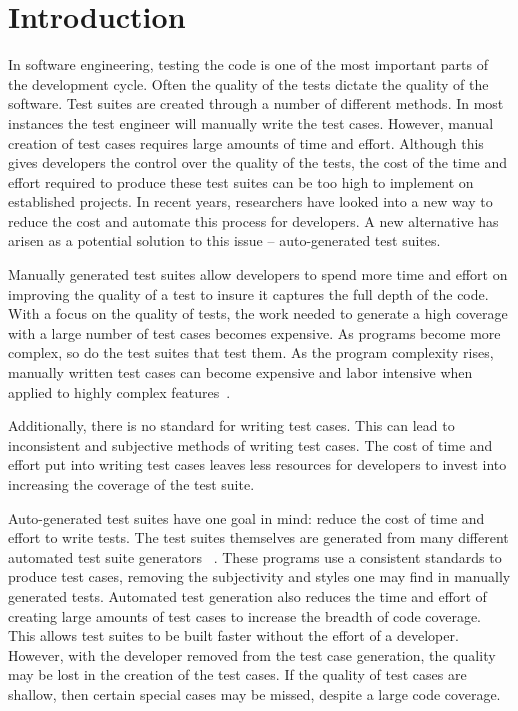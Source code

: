 \section{Introduction}
In software engineering, testing the code is one of the most important parts of the development cycle. Often the quality of the tests dictate the quality of the software. Test suites are created through a number of different methods. In most instances the test engineer will manually write the test cases. However, manual creation of test cases requires large amounts of time and effort. Although this gives developers the control over the quality of the tests, the cost of the time and effort required to produce these test suites can be too high to implement on established projects. In recent years, researchers have looked into a new way to reduce the cost and automate this process for developers. A new alternative has arisen as a potential solution to this issue -- auto-generated test suites. 

Manually generated test suites allow developers to spend more time and effort on improving the quality of a test to insure it captures the full depth of the code. With a focus on the quality of tests, the work needed to generate a high coverage with a large number of test cases becomes expensive. As programs become more complex, so do the test suites that test them. As the program complexity rises, manually written test cases can become expensive and labor intensive when applied to highly complex features~\cite{clarke1998automated}.

Additionally, there is no standard for writing test cases. This can lead to inconsistent and subjective methods of writing test cases. The cost of time and effort put into writing test cases leaves less resources for developers to invest into increasing the coverage of the test suite.

Auto-generated test suites have one goal in mind: reduce the cost of time and effort to write tests. The test suites themselves are generated from many different automated test suite generators ~\cite{Fraser:2011:EAT:2025113.2025179, Zhang:2011:PHA:1985793.1986036, Marinov:2001:TNF:872023.872551}. These programs use a consistent standards to produce test cases, removing the subjectivity and styles one may find in manually generated tests. Automated test generation also reduces the time and effort of creating large amounts of test cases to increase the breadth of code coverage. This allows test suites to be built faster without the effort of a developer. However, with the developer removed from the test case generation, the quality may be lost in the creation of the test cases. If the quality of test cases are shallow, then certain special cases may be missed, despite a large code coverage.

